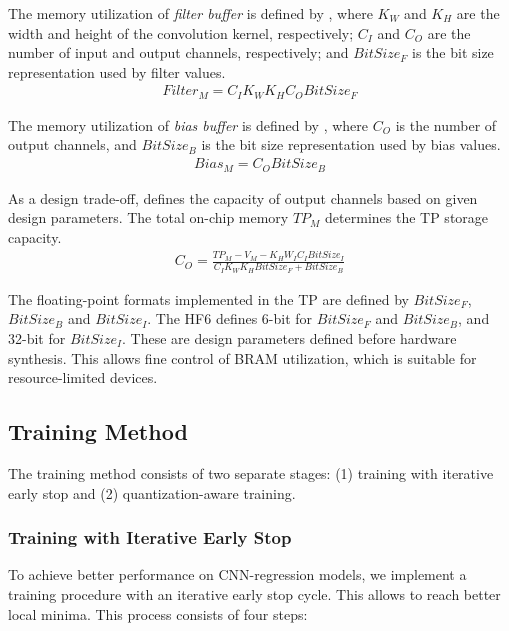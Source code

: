 The memory utilization of \emph{filter buffer} is defined by , where $K_{W}$ and $K_{H}$ are the width and height of the convolution kernel, respectively; $C_{I}$ and $C_{O}$ are the number of input and output channels, respectively; and $BitSize_{F}$ is the bit size representation used by filter values.
\begin{eqnarray} \label{eq:filter_memory}
Filter_{M}=C_{I}K_{W}K_{H}C_{O}BitSize_{F}
\end{eqnarray}

The memory utilization of \emph{bias buffer} is defined by , where $C_{O}$ is the number of output channels, and $BitSize_{B}$ is the bit size representation used by bias values.
\begin{eqnarray} \label{eq:bias_memory}
Bias_{M}=C_{O}BitSize_{B}
\end{eqnarray}

As a design trade-off,  defines the capacity of output channels based on given design parameters. The total on-chip memory $TP_{M}$ determines the TP storage capacity.
\begin{eqnarray} \label{eq:channel_in_memory}
C_{O}=\frac{TP_{M}-V_{M}-K_{H}W_{I}C_{I}BitSize_{I}}{C_{I}K_{W}K_{H}BitSize_{F}+BitSize_{B}}
\end{eqnarray}

The floating-point formats implemented in the TP are defined by $BitSize_F$, $BitSize_B$ and $BitSize_I$. The HF6 defines 6-bit for $BitSize_F$ and $BitSize_B$, and 32-bit for $BitSize_I$. These are design parameters defined before hardware synthesis. This allows fine control of BRAM utilization, which is suitable for resource-limited devices.

\subsection{Training Method}
The training method consists of two separate stages: (1) training with iterative early stop and (2) quantization-aware training.
 
\subsubsection{Training with Iterative Early Stop}
To achieve better performance on CNN-regression models, we implement a training procedure with an iterative early stop cycle. This allows to reach better local minima. This process consists of four steps:

